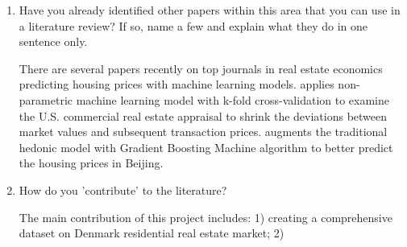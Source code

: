\documentclass[12pt]{article} %
\begin{document}
\begin{enumerate}
  \item Have you already identified other papers within this area that you can use in a literature review? If so, name a few and explain what they do in one sentence only.\par
		There are several papers recently on top journals in real estate economics predicting housing prices with machine learning models. \cite{Deppneretal2023} applies non-parametric machine learning model with k-fold cross-validation to examine the U.S. commercial real estate appraisal to shrink the deviations between market values and subsequent transaction prices. \cite{Linetal2023} augments the traditional hedonic model with Gradient Boosting Machine algorithm to better predict the housing prices in Beijing.
		
  \item How do you 'contribute' to the literature?\par
		The main contribution of this project includes: 1) creating a comprehensive dataset on Denmark residential real estate market; 2)
\end{enumerate}
	
\newpage	
\footnotesize


\end{document}
